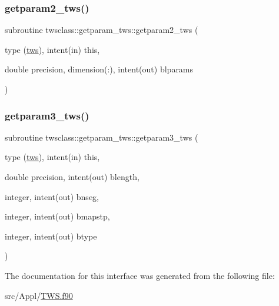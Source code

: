 \mbox{\label{interfacetwsclass_1_1getparam__tws_aa0b0b71e4c7beff3829756f81e66cfc8}} 
\subsubsection{\texorpdfstring{getparam2\_tws()}{getparam2\_tws()}}
{\footnotesize\ttfamily subroutine twsclass\+::getparam\+\_\+tws\+::getparam2\+\_\+tws (\begin{DoxyParamCaption}\item[{type (\mbox{\hyperlink{namespacetwsclass_structtwsclass_1_1tws}{tws}}), intent(in)}]{this,  }\item[{double precision, dimension(\+:), intent(out)}]{blparams }\end{DoxyParamCaption})}

\mbox{\label{interfacetwsclass_1_1getparam__tws_a0340deca6dd4f703531d54db0c0fb8e5}} 
\subsubsection{\texorpdfstring{getparam3\_tws()}{getparam3\_tws()}}
{\footnotesize\ttfamily subroutine twsclass\+::getparam\+\_\+tws\+::getparam3\+\_\+tws (\begin{DoxyParamCaption}\item[{type (\mbox{\hyperlink{namespacetwsclass_structtwsclass_1_1tws}{tws}}), intent(in)}]{this,  }\item[{double precision, intent(out)}]{blength,  }\item[{integer, intent(out)}]{bnseg,  }\item[{integer, intent(out)}]{bmapstp,  }\item[{integer, intent(out)}]{btype }\end{DoxyParamCaption})}



The documentation for this interface was generated from the following file\+:\begin{DoxyCompactItemize}
\item 
src/\+Appl/\mbox{\hyperlink{_t_w_s_8f90}{T\+W\+S.\+f90}}\end{DoxyCompactItemize}
